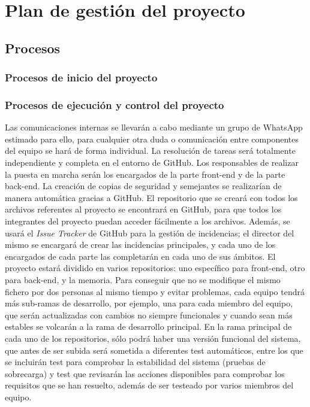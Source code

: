 \documentclass{article}
\begin{document}
\section{Plan de gestión del proyecto}

\subsection{Procesos}

\subsubsection{Procesos de inicio del proyecto}

\subsubsection{Procesos de ejecución y control del proyecto}
Las comunicaciones internas se llevarán a cabo mediante un grupo de WhatsApp estimado para ello, para cualquier otra duda o comunicación entre componentes del equipo se hará de forma individual. La resolución de tareas será totalmente independiente y completa en el entorno de GitHub.
\hfill \break
Los responsables de realizar la puesta en marcha serán los encargados de la parte front-end y de la parte back-end. La creación de copias de seguridad y semejantes se realizarían de manera automática gracias a GitHub. 
\hfill \break
El repositorio que se creará con todos los archivos referentes al proyecto se encontrará en GitHub, para que todos los integrantes del proyecto puedan acceder fácilmente a los archivos. Además, se usará el \textit{Issue Tracker} de GitHub para la gestión de incidencias; el director del mismo se encargará de crear las incidencias principales, y cada uno de los encargados de cada parte las completarán en cada uno de sus ámbitos. 
\hfill \break
El proyecto estará dividido en varios repositorios: uno específico para front-end, otro para back-end, y la memoria. Para conseguir que no se modifique el mismo fichero por dos personas al mismo tiempo y evitar problemas, cada equipo tendrá más sub-ramas de desarrollo, por ejemplo, una para cada miembro del equipo, que serán actualizadas con cambios no siempre funcionales y cuando sean más estables se volcarán a la rama de desarrollo principal. 
\hfill \break
En la rama principal de cada uno de los repositorios, sólo podrá haber una versión funcional del sistema, que antes de ser subida será sometida a diferentes test automáticos, entre los que se incluirán test para comprobar la estabilidad del sistema (pruebas de sobrecarga) y test que revisarán las acciones disponibles para comprobar los requisitos que se han resuelto, además de ser testeado por varios miembros del equipo. 
\end{document}
